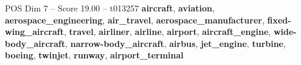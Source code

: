 \begin{textsample}{POS Dim 7 – Score 19.00 – t013257}  \label{ex:f7_pos_023}
\textbf{aircraft}, \textbf{aviation}, \textbf{aerospace\_engineering}, \textbf{air\_travel}, \textbf{aerospace\_manufacturer}, \textbf{fixed-wing\_aircraft}, \textbf{travel}, \textbf{airliner}, \textbf{airline}, \textbf{airport}, \textbf{aircraft\_engine}, \textbf{wide-body\_aircraft}, \textbf{narrow-body\_aircraft}, \textbf{airbus}, \textbf{jet\_engine}, \textbf{turbine}, \textbf{boeing}, \textbf{twinjet}, \textbf{runway}, \textbf{airport\_terminal}

\end{textsample}
